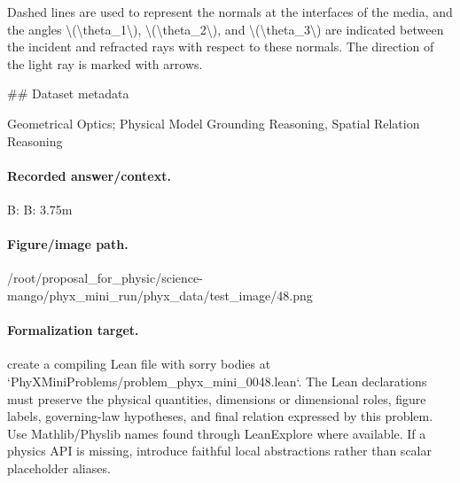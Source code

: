 Dashed lines are used to represent the normals at the interfaces of the media, and the angles \textbackslash{}(\textbackslash{}theta\_1\textbackslash{}), \textbackslash{}(\textbackslash{}theta\_2\textbackslash{}), and \textbackslash{}(\textbackslash{}theta\_3\textbackslash{}) are indicated between the incident and refracted rays with respect to these normals. The direction of the light ray is marked with arrows.

\#\# Dataset metadata

Geometrical Optics; Physical Model Grounding Reasoning, Spatial Relation Reasoning

\paragraph{Recorded answer/context.}
B: B: 3.75m

\paragraph{Figure/image path.}
/root/proposal\_for\_physic/science-mango/phyx\_mini\_run/phyx\_data/test\_image/48.png

\paragraph{Formalization target.}
create a compiling Lean file with sorry bodies at `PhyXMiniProblems/problem\_phyx\_mini\_0048.lean`. The Lean declarations must preserve the physical quantities, dimensions or dimensional roles, figure labels, governing-law hypotheses, and final relation expressed by this problem.
Use Mathlib/Physlib names found through LeanExplore where available. If a physics API is missing, introduce faithful local abstractions rather than scalar placeholder aliases.

